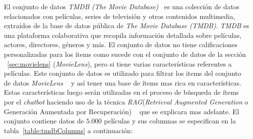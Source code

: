 \documentclass[11pt,a4paper,twoside]{thesis}
\begin{document}
El conjunto de datos \textit{TMDB (The Movie Database)}~\cite{tmdb} es una colección de datos relacionados con películas, series de televisión y otros contenidos multimedia, extraídos de la base de datos pública de \textit{The Movie Database (TMDB)}. \textit{TMDB} es una plataforma colaborativa que recopila información detallada sobre películas, actores, directores, géneros y más.
El conjunto de datos no tiene calificaciones personalizadas para los ítems como sucede con el conjunto de datos de la sección ~\ref{sec:movielens} (\textit{MovieLens}), pero si tiene varias características referentes a películas. Este conjunto de datos es utilizado para filtrar los items del conjunto de datos \textit{MovieLens} ~\cite{movielens} y así tener una base de ítems mas rica en características. Estas características luego serán utilizadas en el proceso de búsqueda de ítems por el \textit{chatbot} haciendo uso de la técnica \textit{RAG}(\textit{Retrieval Augmented Generation} o Generación Aumentada por Recuperación) ~\cite{rag} que se explicara mas adelante. El conjunto contiene datos de $5.000$ películas y sus columnas se especifican en la tabla~\ref{table:tmdbColumns} a continuación:
\end{document}
